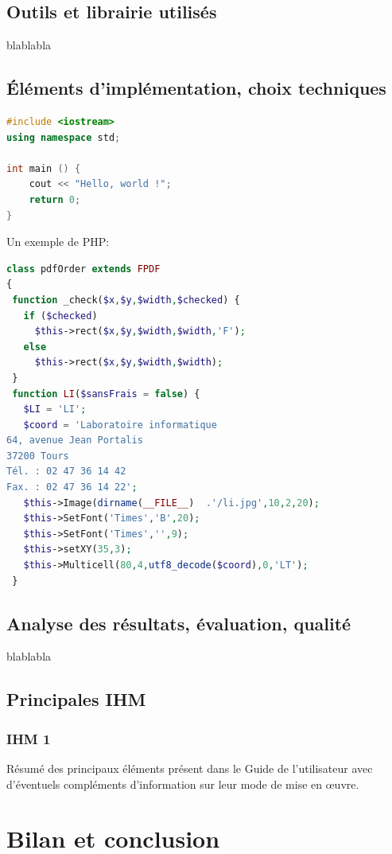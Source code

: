 \documentclass{polytech/polytech}
\numberwithin{figure}{chapter}
\begin{document}
\section{Outils et librairie utilisés}

blablabla

\section{Éléments d'implémentation, choix techniques}

\begin{lstlisting}[language=C++]
#include <iostream>
using namespace std;

int main () {
    cout << "Hello, world !";
    return 0;
}
\end{lstlisting}

Un exemple de PHP:
\begin{lstlisting}[language=php]
class pdfOrder extends FPDF
{
 function _check($x,$y,$width,$checked) {
   if ($checked)
     $this->rect($x,$y,$width,$width,'F');
   else
     $this->rect($x,$y,$width,$width);
 }
 function LI($sansFrais = false) {
   $LI = 'LI';
   $coord = 'Laboratoire informatique
64, avenue Jean Portalis
37200 Tours
Tél. : 02 47 36 14 42
Fax. : 02 47 36 14 22';
   $this->Image(dirname(__FILE__)  .'/li.jpg',10,2,20);
   $this->SetFont('Times','B',20);
   $this->SetFont('Times','',9);
   $this->setXY(35,3);
   $this->Multicell(80,4,utf8_decode($coord),0,'LT');
 }
\end{lstlisting}

\section{Analyse des résultats, évaluation, qualité}

blablabla


\section{Principales IHM}

\subsection{IHM 1}

Résumé des principaux éléments présent dans le Guide de l'utilisateur
avec d'éventuels compléments d'information sur leur mode de mise en œuvre.


\chapter{Bilan et conclusion}
\end{document}
